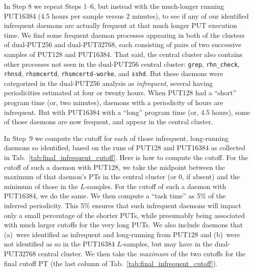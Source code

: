 \documentclass[letter]{ieice}
\begin{document}
In Step 8 we repeat Steps 1--6, but instead with the much-longer running
PUT16384 (4.5 hours per \hbox{sample} versus 2 minutes), to see 
if any of our identified \hbox{infrequent} daemons are actually frequent 
at that much longer PUT execution time. 
We find some frequent daemon processes appearing in both of the 
clusters of \hbox{dual-PUT256} and \hbox{dual-PUT32768}{\color{blue}, each consisting of 
pairs of two successive samples of PUT128 and PUT16384.}
That said, the central cluster also contains other
  processes not seen in the \hbox{dual-PUT256} central cluster: 
  {\tt grep}, {\tt rhn\_check}, {\tt rhnsd}, {\tt rhsmcertd}, 
  {\tt rhsmcertd-worke}, and {\tt sshd}. 
  But these daemons were categorized in the \hbox{dual-PUT256} analysis as {\em
  infrequent}, several having \hbox{periodicities} estimated at four or twenty hours.
{\color{blue}
When PUT128 had a ``short'' 
program time (or, two minutes), daemons with a periodicity of
hours are \hbox{infrequent}. But with PUT16384 
with a ``long'' program time (or, 4.5 hours),} 
some of those daemons are now frequent, and appear in the central cluster.

In Step~9 we compute 
the cutoff for each of those infrequent, long-running daemons so
identified, based on {\color{blue}the runs of PUT128 and 
PUT16384} as collected in Tab.~\ref{tab:final_infrequent_cutoff}. 
Here is how to compute the cutoff. For the cutoff of such a daemon with PUT128, 
we take the \hbox{midpoint} between the maximum of that daemon's PTs in the 
central cluster (or 0, if absent) and the \hbox{minimum} of those in the $L$-samples. 
For the cutoff of such a daemon with PUT16384, we do the same. 
We then compute a ``task time'' as 5\% of the inferred periodicity. 
This 5\% ensures that such infrequent daemons will impact 
only a small percentage of the shorter PUTs, while presumably being 
associated with much larger cutoffs for the very long PUTs. 
We also include daemons that (a)~were identified as infrequent and 
\hbox{long-running} from PUT128 and (b)~were not identified as so in the PUT16384 
\hbox{$L$-samples}, but may have in the \hbox{dual-PUT32768} central cluster.
We then take the {\em maximum} of the two cutoffs for the final cutoff PT 
(the last column of Tab.~\ref{tab:final_infrequent_cutoff}). 
\end{document}
